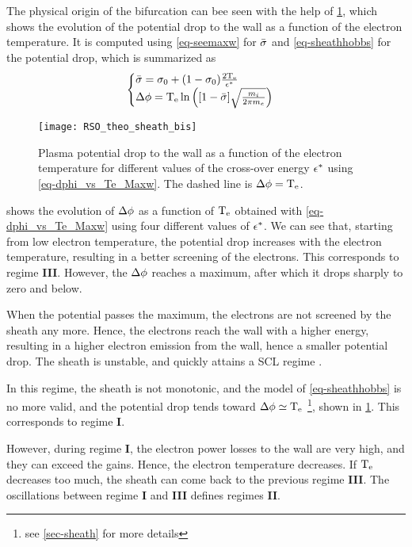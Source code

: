    
   The physical origin of the bifurcation can bee seen with the help of \cref{fig-dphivsTe}, which shows the evolution of the potential drop to the wall as a function of the electron temperature.
   It is computed using \cref{eq-seemaxw} for $ \bar{\sigma }$ and \cref{eq-sheathhobbs} for the potential drop, which is summarized as 
   \begin{equation} \label{eq-dphi_vs_Te_Maxw}
     \begin{cases}
        \bar{\sigma } = \sigma _0 + (1- \sigma _0) \frac{2 \mathrm{T_e}}{\epsilon^{*}} \\
       \Delta \phi = \mathrm{T_e} \ln \left( [1 -  \bar{\sigma }] \sqrt{ \frac{m_i}{2 \pi m_e}}  \right)
     \end{cases}
   \end{equation}

   \begin{figure}[hbtp]
     \centering
     \texttt{[image: RSO\_theo\_sheath\_bis]}
     \caption{Plasma potential drop to the wall as a function of the electron temperature for different values of the cross-over energy $\epsilon^{*}$ using \cref{eq-dphi_vs_Te_Maxw}. The dashed line is $\Delta \phi=\mathrm{T_e}$. }
     \label{fig-dphivsTe}
   \end{figure}
   
    shows the evolution of $\Delta \phi$ as a function of $\mathrm{T_e}$ obtained with \cref{eq-dphi_vs_Te_Maxw} using four different values of $\epsilon^{*}$. 
   We can see that, starting from low electron temperature, the potential drop increases with the electron temperature, resulting in a better screening of the electrons.
   This corresponds to regime {\bf III}.
   However, the $\Delta \phi$ reaches a maximum, after which it drops sharply to zero and below.
   
   When the potential passes the maximum, the electrons are not screened by the sheath any more.
   Hence, the electrons reach the wall with a higher energy, resulting in a higher electron emission from the wall, hence a smaller potential drop.
   The sheath is unstable, and quickly attains a \ac{SCL} regime \citep{raitses2005}.
   
   In this regime, the sheath is not monotonic, and the model of \cref{eq-sheathhobbs} is no more valid, and the potential drop tends toward $\Delta \phi \simeq \mathrm{T_e}$ \citep{hobbs1967,goebel2008} \footnote{see \cref{sec-sheath} for more details}, shown in \cref{fig-dphivsTe}.
   This corresponds to regime {\bf I}.
   
   However, during regime {\bf I}, the electron power losses to the wall are very high, and they can exceed the gains.
   Hence, the electron temperature decreases.
   If $\mathrm{T_e}$ decreases too much, the sheath can come back to the previous regime {\bf III}.
   The oscillations between regime {\bf I} and {\bf III} defines regimes {\bf II}.
      
